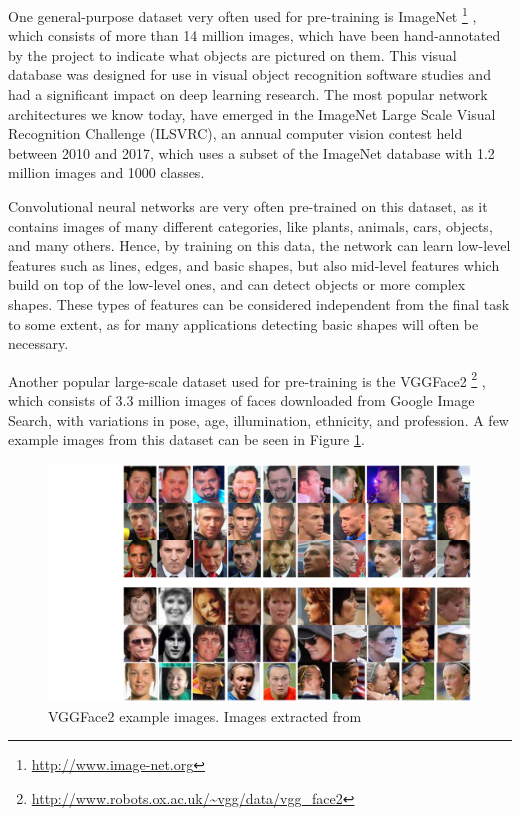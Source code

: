 One general-purpose dataset very often used for pre-training is ImageNet \footnote{\url{http://www.image-net.org}} \citep{DengDSLL009}, which consists of more than 14 million images, which have been hand-annotated by the project to indicate what objects are pictured on them. This visual database was designed for use in visual object recognition software studies and had a significant impact on deep learning research. The most popular network architectures we know today, have emerged in the ImageNet Large Scale Visual Recognition Challenge (ILSVRC), an annual computer vision contest held between 2010 and 2017, which uses a subset of the ImageNet database with 1.2 million images and 1000 classes. 

Convolutional neural networks are very often pre-trained on this dataset, as it contains images of many different categories, like plants, animals, cars, objects, and many others. Hence, by training on this data, the network can learn low-level features such as lines, edges, and basic shapes, but also mid-level features which build on top of the low-level ones, and can detect objects or more complex shapes. These types of features can be considered independent from the final task to some extent, as for many applications detecting basic shapes will often be necessary.

Another popular large-scale dataset used for pre-training is the VGGFace2 \footnote{\url{http://www.robots.ox.ac.uk/~vgg/data/vgg_face2}} \citep{Cao2018}, which consists of 3.3 million images of faces downloaded from Google Image Search, with variations in pose, age, illumination, ethnicity, and profession. A few example images from this dataset can be seen in Figure \ref{fig:vggface}.

\begin{figure}[h!tp]
    \centering
\hspace{-1in}
    \includegraphics[width=.95\textwidth]{imgs/chap5_vggface2.png}
    \caption[VGGFace2 example images.]{VGGFace2 example images. Images extracted from \cite{Cao2018}}
    \label{fig:vggface}
\end{figure}

